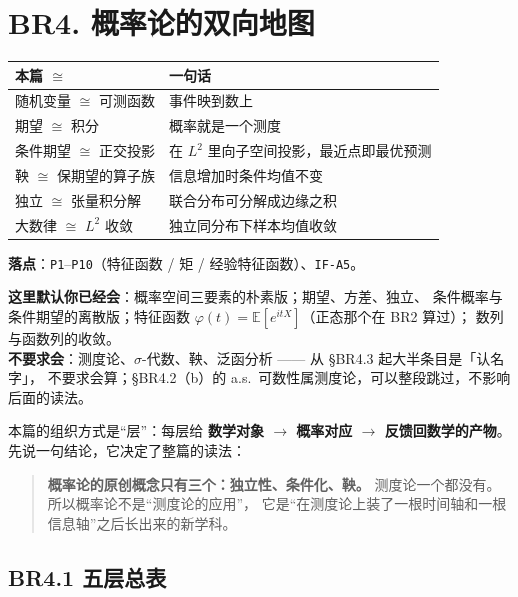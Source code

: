 \section{BR4. 概率论的双向地图}
\label{sec:br4}

\begin{center}
\small
\begin{tabular}{L{3.4cm}L{10.4cm}}
\toprule
\textbf{本篇 $\cong$} & \textbf{一句话} \\
\midrule
随机变量 $\cong$ 可测函数 & 事件映到数上 \\
期望 $\cong$ 积分 & 概率就是一个测度 \\
条件期望 $\cong$ 正交投影 & 在 $L^2$ 里向子空间投影，最近点即最优预测 \\
鞅 $\cong$ 保期望的算子族 & 信息增加时条件均值不变 \\
独立 $\cong$ 张量积分解 & 联合分布可分解成边缘之积 \\
大数律 $\cong$ $L^2$ 收敛 & 独立同分布下样本均值收敛 \\
\bottomrule
\end{tabular}
\end{center}

\noindent\textbf{落点}：\texttt{P1}--\texttt{P10}（特征函数 / 矩 / 经验特征函数）、\texttt{IF-A5}。

\noindent\small\textbf{这里默认你已经会}：概率空间三要素的朴素版；期望、方差、独立、
条件概率与条件期望的离散版；特征函数 $\varphi(t)=\mathbb{E}[e^{itX}]$（正态那个在 BR2 算过）；
数列与函数列的收敛。\\
\textbf{不要求会}：测度论、$\sigma$-代数、鞅、泛函分析 —— 从 \S BR4.3 起大半条目是「认名字」，
不要求会算；\S BR4.2（b）的 a.s.\ 可数性属测度论，可以整段跳过，不影响后面的读法。\normalsize
\smallskip

本篇的组织方式是“层”：每层给 \textbf{数学对象 $\to$ 概率对应 $\to$ 反馈回数学的产物}。
先说一句结论，它决定了整篇的读法：

\begin{quote}
\textbf{概率论的原创概念只有三个：独立性、条件化、鞅。}
测度论一个都没有。所以概率论不是“测度论的应用”，
它是“在测度论上装了一根时间轴和一根信息轴”之后长出来的新学科。
\end{quote}

\subsection{BR4.1 五层总表}

